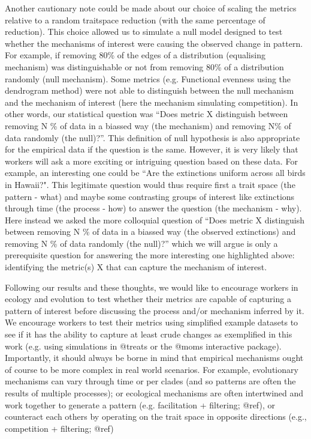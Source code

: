 \documentclass[12pt,letterpaper]{article}
\begin{document}
Another cautionary note could be made about our choice of scaling the metrics relative to a random traitspace reduction (with the same percentage of reduction).
This choice allowed us to simulate a null model designed to test whether the mechanisms of interest were causing the observed change in pattern.
For example, if removing 80\% of the edges of a distribution (equalising mechanism) was distinguishable or not from removing 80\% of a distribution randomly (null mechanism).
Some metrics (e.g. Functional evenness using the dendrogram method) were not able to distinguish between the null mechanism and the mechanism of interest (here the mechanism simulating competition).
In other words, our statistical question was “Does metric X distinguish between removing N \% of data in a biassed way (the mechanism) and removing N\% of data randomly (the null)?”.
This definition of null hypothesis is also appropriate for the empirical data if the question is the same.
However, it is very likely that workers will ask a more exciting or intriguing question based on these data.
For example, an interesting one could be “Are the extinctions uniform across all birds in Hawaii?".
This legitimate question would thus require first a trait space (the pattern - what) and maybe some contrasting groups of interest like extinctions through time (the process - how) to answer the question (the mechanism - why).
Here instead we asked the more colloquial question of  “Does metric X distinguish between removing N \% of data in a biassed way (the observed extinctions) and removing N \% of data randomly (the null)?” which we will argue is only a prerequisite question for answering the more interesting one highlighted above: identifying the metric(s) X that can capture the mechanism of interest.

Following our results and these thoughts, we would like to encourage workers in ecology and evolution to test whether their metrics are capable of capturing a pattern of interest before discussing the process and/or mechanism inferred by it.
We encourage workers to test their metrics using simplified example datasets to see if it has the ability to capture at least crude changes as exemplified in this work (e.g.
using simulations in @treats or the @moms interactive package).
Importantly, it should always be borne in mind that empirical mechanisms ought of course to be more complex in real world scenarios.
For example, evolutionary mechanisms can vary through time or per clades (and so patterns are often the results of multiple processes); or ecological mechanisms are often intertwined and work together to generate a pattern (e.g.
facilitation + filtering; @ref), or counteract each others by operating on the trait space in opposite directions (e.g., competition + filtering; @ref)
\end{document}
